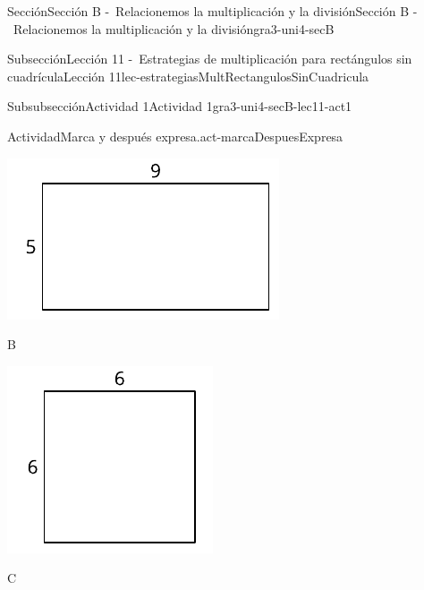 \documentclass[twoside,10pt,]{article}
\begin{document}
\begin{sectionptx}{Sección}{Sección B -~Relacionemos la multiplicación y la división}{}{Sección B -~Relacionemos la multiplicación y la división}{}{}{gra3-uni4-secB}
\begin{subsectionptx}{Subsección}{Lección 11 -~Estrategias de multiplicación para rectángulos sin cuadrícula}{}{Lección 11}{}{}{lec-estrategiasMultRectangulosSinCuadricula}
\begin{subsubsectionptx}{Subsubsección}{Actividad 1}{}{Actividad 1}{}{}{gra3-uni4-secB-lec11-act1}
\begin{activity}{Actividad}{Marca y después expresa.}{act-marcaDespuesExpresa}
\begin{sidebyside}{3}{0}{0}{0}
\begin{sbspanel}{0.391}
\includegraphics[width=\linewidth]{external/svg-source/tikz-file-153084.pdf}
\end{sbspanel}%
\begin{sbspanel}{0.261}%
B%
\par
\includegraphics[width=\linewidth]{external/svg-source/tikz-file-153085.pdf}
\end{sbspanel}%
\begin{sbspanel}{0.348}%
C%
\par

\end{sbspanel}
\end{sidebyside}
\end{activity}
\end{subsubsectionptx}
\end{subsectionptx}
\end{sectionptx}
\end{document}
